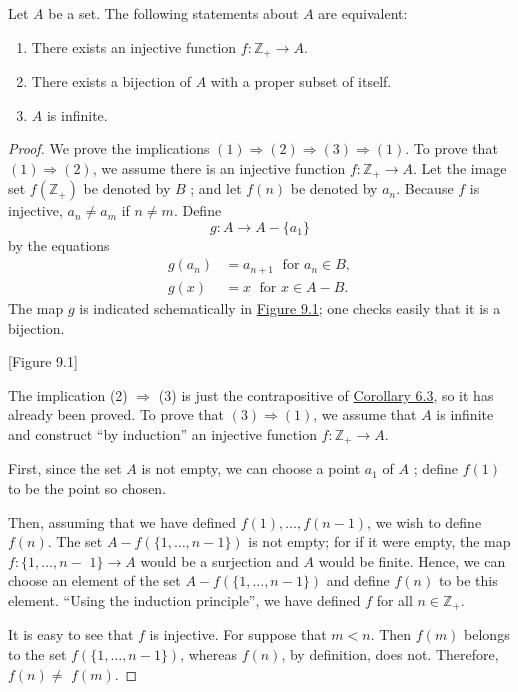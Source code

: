 \begin{theorem}
\label{thm:\thetheorem} 
 Let \(A\) be a set. The following statements about \(A\) are equivalent:

 \begin{enumerate}[itemsep=0.2em, parsep=0pt, topsep=0pt, partopsep=0pt, leftmargin=*, label=(\arabic*), align=left]
 \item There exists an injective function \(f : \mathbb{Z}_{+} \rightarrow A\).

 \item There exists a bijection of \(A\) with a proper subset of itself.

 \item \(A\) is infinite.
 \end{enumerate}
\end{theorem}

\begin{proof}
 We prove the implications \((1) \Rightarrow (2) \Rightarrow ( 3) \Rightarrow (1)\). To prove that \((1) \Rightarrow (2)\), we assume there is an injective function \(f : \mathbb{Z}_{+} \rightarrow A\). Let the image set \(f(\mathbb{Z}_{+})\) be denoted by \(B\) ; and let \(f(n)\) be denoted by \(a_{n}\). Because \(f\) is injective, \(a_{n} \neq {a}_{m}\) if \(n \neq m\). Define
 \[
 g : A \rightarrow A - \{ a_{1}\}
 \]
 by the equations
 \[
 \begin{aligned}
 g(a_{n}) &= a_{n + 1}\;\text{ for }a_{n} \in B, \\
 g(x) &= x\;\text{ for }x \in A - B.
 \end{aligned}
 \]
 The map \(g\) is indicated schematically in \hyperref[fig:9.1]{Figure 9.1}; one checks easily that it is a bijection.

 [Figure 9.1]

 The implication (2) \(\Rightarrow\) (3) is just the contrapositive of \hyperref[cor:6.3]{Corollary 6.3}, so it has already been proved. To prove that \(( 3) \Rightarrow (1)\), we assume that \(A\) is infinite and construct ``by induction'' an injective function \(f : \mathbb{Z}_{+} \rightarrow A\).

 First, since the set \(A\) is not empty, we can choose a point \(a_{1}\) of \(A\) ; define \(f(1)\) to be the point so chosen.

 Then, assuming that we have defined \(f(1),\ldots, f({n - 1})\), we wish to define \(f(n)\). The set \(A - f({\{1,\ldots, n - 1\} })\) is not empty; for if it were empty, the map \(f : \{1,\ldots, n -\) \(1\} \rightarrow A\) would be a surjection and \(A\) would be finite. Hence, we can choose an element of the set \(A - f({\{1,\ldots, n - 1\} })\) and define \(f(n)\) to be this element. ``Using the induction principle'', we have defined \(f\) for all \(n \in {\mathbb{Z}}_{+}\).

 It is easy to see that \(f\) is injective. For suppose that \(m < n\). Then \(f( m)\) belongs to the set \(f({\{1,\ldots, n - 1\} })\), whereas \(f(n)\), by definition, does not. Therefore, \(f(n) \neq\) \(f( m)\).
\end{proof}

